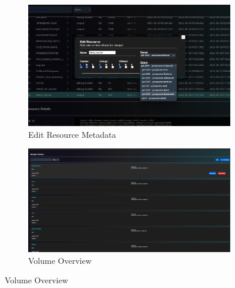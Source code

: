 \begin{figure}[!htbp]
    \centering
    \begin{subfigure}[b]{0.48\textwidth}
        \includegraphics[width=\textwidth]{Images/kuspace_admin_EditResource.png}
        \caption{Edit Resource Metadata}
        \label{fig:admineditresource}
    \end{subfigure}
    \hfill
    \begin{subfigure}[b]{0.48\textwidth}
        \includegraphics[width=\textwidth]{Images/kuspace_admin_ManageVolumes.png}
        \caption{Volume Overview}
        \label{fig:adminmanagevolumes}
    \end{subfigure}

    \vspace{1em}


\end{figure}
